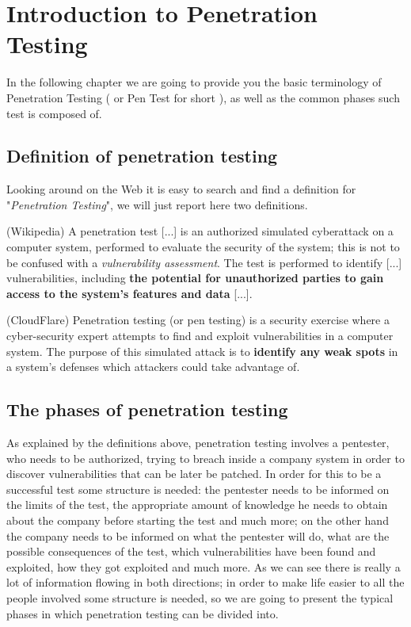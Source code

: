 \section{Introduction to Penetration Testing}
\label{sec:pentesting}

In the following chapter we are going to provide you the basic terminology of Penetration Testing ( or Pen Test for short ), as well as the common phases such test is composed of.

\subsection{Definition of penetration testing}
Looking around on the Web it is easy to search and find a definition for "\textit{Penetration Testing}", we will just report here two definitions.

\begin{definition}{(Wikipedia)}
A penetration test [...] is an authorized simulated cyberattack on a computer system, performed to evaluate the security of the system; this is not to be confused with a \textit{vulnerability assessment}. The test is performed to identify [...] vulnerabilities, including \textbf{the potential for unauthorized parties to gain access to the system's features and data} [...].
\end{definition}

\begin{definition}{(CloudFlare)}
Penetration testing (or pen testing) is a security exercise where a cyber-security expert attempts to find and exploit vulnerabilities in a computer system. The purpose of this simulated attack is to \textbf{identify any weak spots} in a system’s defenses which attackers could take advantage of.
\end{definition}

\subsection{The phases of penetration testing}
As explained by the definitions above, penetration testing involves a pentester, who needs to be authorized, trying to breach inside a company system in order to discover vulnerabilities that can be later be patched. In order for this to be a successful test some structure is needed: the pentester needs to be informed on the limits of the test, the appropriate amount of knowledge he needs to obtain about the company before starting the test and much more; on the other hand the company needs to be informed on what the pentester will do, what are the possible consequences of the test, which vulnerabilities have been found and exploited, how they got exploited and much more.\cite{online:guide-penetration-testing}
\newline
As we can see there is really a lot of information flowing in both directions; in order to make life easier to all the people involved some structure is needed, so we are going to present the typical phases in which penetration testing can be divided into.

